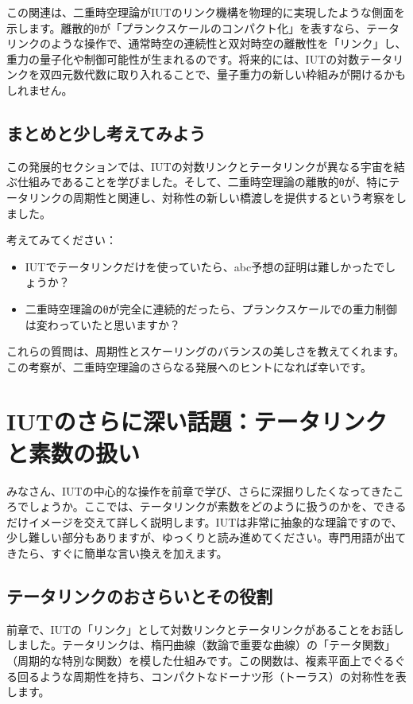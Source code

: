 \documentclass[dvipdfmx,12pt,a4paper]{jsarticle}
\begin{document}
この関連は、二重時空理論がIUTのリンク機構を物理的に実現したような側面を示します。離散的θが「プランクスケールのコンパクト化」を表すなら、テータリンクのような操作で、通常時空の連続性と双対時空の離散性を「リンク」し、重力の量子化や制御可能性が生まれるのです。将来的には、IUTの対数テータリンクを双四元数代数に取り入れることで、量子重力の新しい枠組みが開けるかもしれません。

\subsection{まとめと少し考えてみよう}

この発展的セクションでは、IUTの対数リンクとテータリンクが異なる宇宙を結ぶ仕組みであることを学びました。そして、二重時空理論の離散的θが、特にテータリンクの周期性と関連し、対称性の新しい橋渡しを提供するという考察をしました。

考えてみてください：
\begin{itemize}
  \item IUTでテータリンクだけを使っていたら、abc予想の証明は難しかったでしょうか？
  \item 二重時空理論のθが完全に連続的だったら、プランクスケールでの重力制御は変わっていたと思いますか？
\end{itemize}

これらの質問は、周期性とスケーリングのバランスの美しさを教えてくれます。この考察が、二重時空理論のさらなる発展へのヒントになれば幸いです。

\section{IUTのさらに深い話題：テータリンクと素数の扱い}

みなさん、IUTの中心的な操作を前章で学び、さらに深掘りしたくなってきたころでしょうか。ここでは、テータリンクが素数をどのように扱うのかを、できるだけイメージを交えて詳しく説明します。IUTは非常に抽象的な理論ですので、少し難しい部分もありますが、ゆっくりと読み進めてください。専門用語が出てきたら、すぐに簡単な言い換えを加えます。

\subsection{テータリンクのおさらいとその役割}

前章で、IUTの「リンク」として対数リンクとテータリンクがあることをお話ししました。テータリンクは、楕円曲線（数論で重要な曲線）の「テータ関数」（周期的な特別な関数）を模した仕組みです。この関数は、複素平面上でぐるぐる回るような周期性を持ち、コンパクトなドーナツ形（トーラス）の対称性を表します。
\end{document}
